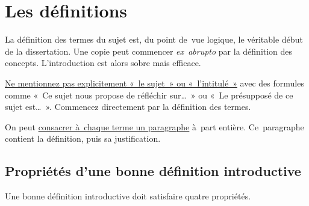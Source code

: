\documentclass[a4paper,12pt]{report}
\begin{document}
\section{Les définitions}
\label{sec:org29d7eb9}
\label{orge9f617a}

La définition des termes du sujet est, du point de vue logique, le
véritable début de la dissertation. Une copie peut commencer
\emph{ex abrupto} par la définition des concepts. L'introduction est alors
sobre mais efficace.

\uline{Ne mentionnez pas explicitement « le sujet » ou « l'intitulé »} avec
des formules comme « Ce sujet nous propose de réfléchir sur\ldots{} » ou « Le
présupposé de ce sujet est\ldots{} ». Commencez directement par la définition
des termes.

On peut \uline{consacrer à chaque terme un paragraphe} à part entière.
Ce paragraphe contient la définition, puis sa justification.


\subsection{Propriétés d'une bonne définition introductive}
\label{sec:orgb7102c0}

Une bonne définition introductive doit satisfaire quatre propriétés.
\end{document}
